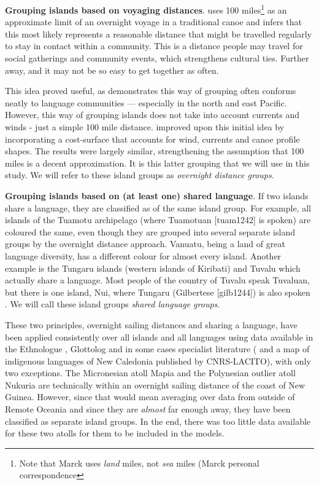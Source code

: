\documentclass[a4paper,10pt]{article} %
\begin{document}

\textbf{Grouping islands based on voyaging distances}. \citet{mark_1986, marck2000} uses 100 miles\footnote{Note that Marck uses \emph{land} miles, not \emph{sea} miles (Marck personal correspondence} as an approximate limit of an overnight voyage in a traditional canoe and infers that this most likely represents a reasonable distance that might be travelled regularly to stay in contact within a community. This is a distance people may travel for social gatherings and community events, which strengthens cultural ties. Further away, and it may not be so easy to get together as often. 

This idea proved useful, as \citet{mark_1986, marck2000} demonstrates this way of grouping often conforms neatly to language communities --- especially in the north and east Pacific. However, this way of grouping islands does not take into account currents and winds - just a simple 100 mile distance. \citet{NZSA_overnight_2023} improved upon this initial idea by incorporating a cost-surface that accounts for wind, currents and canoe profile shapes. The results were largely similar, strengthening the assumption that 100 miles is a decent approximation. It is this latter grouping that we will use in this study. We will refer to these island groups as \textit{overnight distance groups}. 

\textbf{Grouping islands based on (at least one) shared language}. If two islands share a language, they are classified as of the same island group. For example, all islands of the Tuamotu archipelago (where Tuamotuan [tuam1242] is spoken) are coloured the same, even though they are grouped into several separate island groups by the overnight distance approach. Vanuatu, being a land of great language diversity, has a different colour for almost every island. Another example is the Tungaru islands (western islands of Kiribati) and Tuvalu which actually share a language. Most people of the country of Tuvalu speak Tuvaluan, but there is one island, Nui, where Tungaru (Gilbertese [gilb1244]) is also spoken \citep{faaniu1983tuvalu, macdonald_2020, omniglot_tuvaluan}. We will call these island groups \textit{shared language groups}.

These two principles, overnight sailing distances and sharing a language, have been applied consistently over all islands and all languages using data available in the Ethnologue \citep{ethnologue22}, Glottolog \citep{glottolog40} and in some cases specialist literature (\citet{faaniu1983tuvalu,charpentier2012linguistic, francoisetatl2015, macdonald_2020, omniglot_tuvaluan} and a map of indigenous languages of New Caledonia published by CNRS-LACITO), with only two exceptions. The Micronesian atoll Mapia and the Polynesian outlier atoll Nukuria are technically within an overnight sailing distance of the coast of New Guinea. However, since that would mean averaging over data from outside of Remote Oceania and since they are \emph{almost} far enough away, they have been classified as separate island groups. In the end, there was too little data available for these two atolls for them to be included in the models. 
\end{document}
